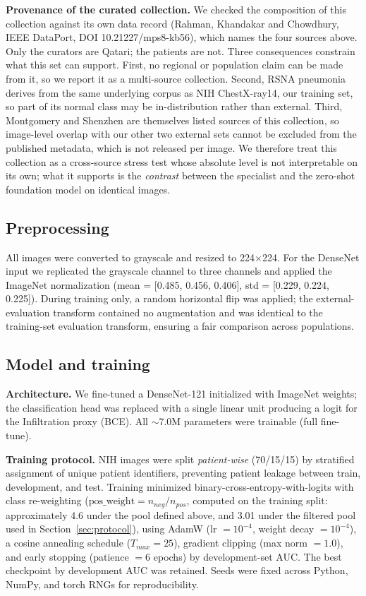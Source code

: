 \documentclass[runningheads]{llncs}
\begin{document}
\textbf{Provenance of the curated collection.} We checked the composition of this collection against its own data record (Rahman, Khandakar and Chowdhury, IEEE DataPort, DOI 10.21227/mps8-kb56), which names the four sources above. Only the curators are Qatari; the patients are not. Three consequences constrain what this set can support. First, no regional or population claim can be made from it, so we report it as a multi-source collection. Second, RSNA pneumonia derives from the same underlying corpus as NIH ChestX-ray14, our training set, so part of its normal class may be in-distribution rather than external. Third, Montgomery and Shenzhen are themselves listed sources of this collection, so image-level overlap with our other two external sets cannot be excluded from the published metadata, which is not released per image. We therefore treat this collection as a cross-source stress test whose absolute level is not interpretable on its own; what it supports is the \emph{contrast} between the specialist and the zero-shot foundation model on identical images.

\subsection{Preprocessing}
All images were converted to grayscale and resized to 224$\times$224. For the DenseNet input we replicated the grayscale channel to three channels and applied the ImageNet normalization (mean = [0.485, 0.456, 0.406], std = [0.229, 0.224, 0.225]). During training only, a random horizontal flip was applied; the external-evaluation transform contained no augmentation and was identical to the training-set evaluation transform, ensuring a fair comparison across populations.

\subsection{Model and training}
\textbf{Architecture.} We fine-tuned a DenseNet-121 initialized with ImageNet weights; the classification head was replaced with a single linear unit producing a logit for the Infiltration proxy (BCE). All $\sim$7.0M parameters were trainable (full fine-tune).

\textbf{Training protocol.} NIH images were split \emph{patient-wise} (70/15/15) by stratified assignment of unique patient identifiers, preventing patient leakage between train, development, and test. Training minimized binary-cross-entropy-with-logits with class re-weighting ($\mathrm{pos\_weight} = n_{neg}/n_{pos}$, computed on the training split: approximately 4.6 under the pool defined above, and 3.01 under the filtered pool used in Section~\ref{sec:protocol}), using AdamW (lr $=10^{-4}$, weight decay $=10^{-4}$), a cosine annealing schedule ($T_{max}=25$), gradient clipping (max norm $=1.0$), and early stopping (patience $=6$ epochs) by development-set AUC. The best checkpoint by development AUC was retained. Seeds were fixed across Python, NumPy, and torch RNGs for reproducibility.
\end{document}
